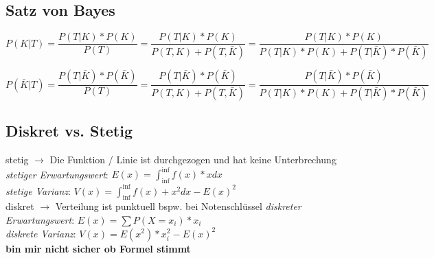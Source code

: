 \documentclass[a4paper]{article}
\theoremstyle{definition}
\theoremstyle{example}
\begin{document}
\subsection{Satz von Bayes}
\begin{equation}
	P(K|T) = \frac{P(T|K) * P(K)}{P(T)} = \frac{P(T|K) * P(K)}{P(T, K) + P(T, \bar{K})} = \frac{P(T|K) * P(K)}{P(T|K) * P(K) + P(T|\bar{K}) * P(\bar{K})}
\end{equation}

\begin{equation}
	P(\bar{K}|T) = \frac{P(T|\bar{K}) * P(\bar{K})}{P(T)} = \frac{P(T|\bar{K}) * P(\bar{K})}{P(T, K) + P(T, \bar{K})} = \frac{P(T|\bar{K}) * P(\bar{K})}{P(T|K) * P(K) + P(T|\bar{K}) * P(\bar{K})}
\end{equation}

\subsection{Diskret vs. Stetig}
stetig $\rightarrow$ Die Funktion / Linie ist durchgezogen und hat keine Unterbrechung\\
\textit{stetiger Erwartungswert}: $E(x) = \int^{\inf}_{\inf} f(x) * x dx$\\
\textit{stetige Varianz}: $V(x) = \int^{\inf}_{\inf} f(x) + x^2 dx - E(x)^2$\\
diskret $\rightarrow$ Verteilung ist punktuell bspw. bei Notenschlüssel
\textit{diskreter Erwartungswert}: $E(x) = \sum P(X=x_i) * x_i$\\
\textit{diskrete Varianz}: $V(x) = E(x^2) * x_i^2 - E(x)^2$\\ \textbf{bin mir nicht sicher ob Formel stimmt}
\end{document}
